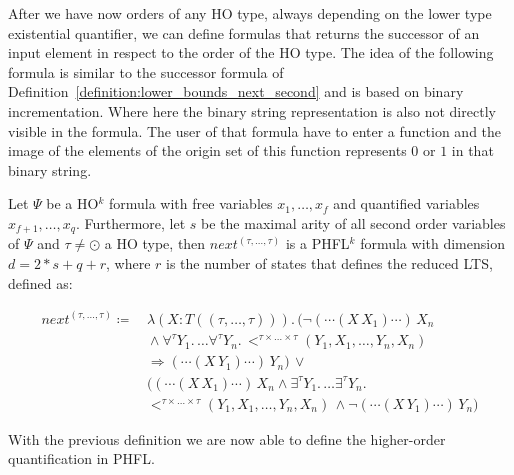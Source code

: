 After we have now orders of any HO type, always depending on the lower type existential quantifier, we can define
formulas that returns the successor of an input element in respect to the order of the HO type. The idea of the
following formula is similar to the successor formula of Definition~\ref{definition:lower_bounds_next_second} and is
based on binary incrementation. Where here the binary string representation is also not directly visible in the
formula. The user of that formula have to enter a function and the image of the elements of the origin set of this
function represents $0$ or $1$ in that binary string.

\begin{definition}
    \label{definition:lower_bounds_next_higher}
    Let $\Psi$ be a HO$^k$ formula with free variables $x_1, \dots, x_f$ and quantified variables $x_{f+1}, \dots,
    x_q$. Furthermore, let $s$ be the maximal arity of all second order variables of $\Psi$ and $\tau \neq \odot$ a
    HO type, then $next^{(\tau, \dots, \tau)}$ is a PHFL$^k$ formula with dimension $d = 2 * s + q + r$, where $r$ is the number of states that defines the reduced LTS, defined as:

    \begin{align*}
        next^{(\tau, \dots, \tau)} \coloneqq &\,\lambda (X \colon T ((\tau, \dots, \tau))).\,\big(\neg (\dotsb(X\,X_1)\dotsb)\,X_n \\&\, \wedge \forall^{\tau}Y_1.\, \dots \forall^{\tau}Y_n.\,<^{\tau \times
        \dots \times \tau}(Y_1, X_1, \dots, Y_n, X_n) \\&\,\Rightarrow  (\dotsb(X\,Y_1)\dotsb)\,Y_n\big) \,\vee
        \\&\,\big((\dotsb (X\,X_1) \dotsb)\,X_n \wedge \exists^{\tau}Y_1.\, \dots \exists^{\tau}Y_n.\, \\&\,
        <^{\tau \times \dots \times \tau}
        (Y_1, X_1, \dots, Y_n, X_n)\,\wedge \neg (\dotsb(X\,Y_1)\dotsb)\,Y_n\big)
    \end{align*}
\end{definition}

With the previous definition we are now able to define the higher-order quantification in PHFL.

